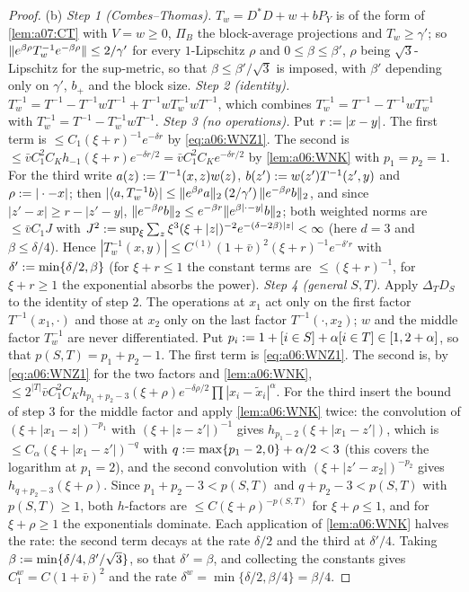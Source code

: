 \begin{proof}
(b) \emph{Step 1 (Combes--Thomas).} $T_w=D^*D+w+bP_Y$ is of the form of \cref{lem:a07:CT} with $V=w\ge0$, $\Pi_B$ the block-average projections and $T_w\ge\gamma'$; so $\lVert e^{\beta\rho}T_w^{-1}e^{-\beta\rho}\rVert\le2/\gamma'$ for every $1$-Lipschitz $\rho$ and $0\le\beta\le\beta'$, $\rho$ being $\sqrt3$-Lipschitz for the sup-metric, so that $\beta\le\beta'/\sqrt3$ is imposed, with $\beta'$ depending only on $\gamma'$, $b_+$ and the block size.
\emph{Step 2 (identity).} $T_w^{-1}=T^{-1}-T^{-1}wT^{-1}+T^{-1}wT_w^{-1}wT^{-1}$, which combines $T_w^{-1}=T^{-1}-T^{-1}wT_w^{-1}$ with $T_w^{-1}=T^{-1}-T_w^{-1}wT^{-1}$.
\emph{Step 3 (no operations).} Put $r:=|x-y|$. The first term is $\le C_1(\xi+r)^{-1}e^{-\delta r}$ by \eqref{eq:a06:WNZ1}. The second is $\le\bar vC_1^2C_Kh_{-1}(\xi+r)e^{-\delta r/2}=\bar vC_1^2C_Ke^{-\delta r/2}$ by \cref{lem:a06:WNK} with $p_1=p_2=1$. For the third write $a(z):= T^{-1}(x,z)w(z)$, $b(z'):= w(z')T^{-1}(z',y)$ and $\rho:=|\cdot-x|$; then $|\langle a,T_w^{-1}b\rangle|\le\lVert e^{\beta\rho}a\rVert_2\,(2/\gamma')\,\lVert e^{-\beta\rho}b\rVert_2$, and since $|z'-x|\ge r-|z'-y|$, $\lVert e^{-\beta\rho}b\rVert_2\le e^{-\beta r}\lVert e^{\beta|\cdot-y|}b\rVert_2$; both weighted norms are $\le\bar vC_1J$ with $J^2:=\sup_\xi\sum_z\xi^3(\xi+|z|)^{-2}e^{-(\delta-2\beta)|z|}<\infty$ (here $d=3$ and $\beta\le\delta/4$). Hence $|T_w^{-1}(x,y)|\le C^{(1)}(1+\bar v)^2(\xi+r)^{-1}e^{-\delta'r}$ with $\delta':=\min\{\delta/2,\beta\}$ (for $\xi+r\le1$ the constant terms are $\le(\xi+r)^{-1}$, for $\xi+r\ge1$ the exponential absorbs the power).
\emph{Step 4 (general $S,T$).} Apply $\Delta_TD_S$ to the identity of step 2. The operations at $x_1$ act only on the first factor $T^{-1}(x_1,\cdot)$ and those at $x_2$ only on the last factor $T^{-1}(\cdot,x_2)$; $w$ and the middle factor $T_w^{-1}$ are never differentiated. Put $p_i:=1+[i\in S]+\alpha[i\in T]\in[1,2+\alpha]$, so that $p(S,T)=p_1+p_2-1$. The first term is \eqref{eq:a06:WNZ1}. The second is, by \eqref{eq:a06:WNZ1} for the two factors and \cref{lem:a06:WNK}, $\le2^{|T|}\bar vC_1^2C_Kh_{p_1+p_2-3}(\xi+\rho)e^{-\delta\rho/2}\prod|x_i-\tilde x_i|^\alpha$. For the third insert the bound of step 3 for the middle factor and apply \cref{lem:a06:WNK} twice: the convolution of $(\xi+|x_1-z|)^{-p_1}$ with $(\xi+|z-z'|)^{-1}$ gives $h_{p_1-2}(\xi+|x_1-z'|)$, which is $\le C_\alpha(\xi+|x_1-z'|)^{-q}$ with $q:=\max\{p_1-2,0\}+\alpha/2<3$ (this covers the logarithm at $p_1=2$), and the second convolution with $(\xi+|z'-x_2|)^{-p_2}$ gives $h_{q+p_2-3}(\xi+\rho)$. Since $p_1+p_2-3<p(S,T)$ and $q+p_2-3<p(S,T)$ with $p(S,T)\ge1$, both $h$-factors are $\le C(\xi+\rho)^{-p(S,T)}$ for $\xi+\rho\le1$, and for $\xi+\rho\ge1$ the exponentials dominate. Each application of \cref{lem:a06:WNK} halves the rate: the second term decays at the rate $\delta/2$ and the third at $\delta'/4$. Taking $\beta:=\min\{\delta/4,\beta'/\sqrt3\}$, so that $\delta'=\beta$, and collecting the constants gives $C_1^w=C(1+\bar v)^2$ and the rate $\delta^w=\min\{\delta/2,\beta/4\}=\beta/4$.


\end{proof}
